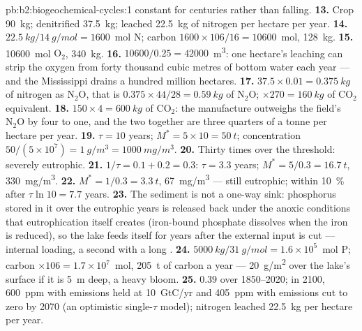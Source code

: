 \begin{solution}{pb:b2:biogeochemical-cycles:1}
constant for centuries rather than falling.
\textbf{13.} Crop \qty{90}{kg}; denitrified \qty{37.5}{kg}; leached
\qty{22.5}{kg} of nitrogen per hectare per year.
\textbf{14.} $\qty{22.5}{kg}/\qty{14}{g/mol} = 1600$~mol N; carbon
$1600\times 106/16 = \num{10600}$~mol, \qty{128}{kg}.
\textbf{15.} \num{10600}~mol $\mathrm{O_2}$, \qty{340}{kg}.
\textbf{16.} $\num{10600}/0.25 = \num{42000}$~\unit{m^3}: one
hectare's leaching can strip the oxygen from forty thousand cubic
metres of bottom water each year --- and the Mississippi drains
a hundred million hectares.
\textbf{17.} $37.5\times 0.01 = \qty{0.375}{kg}$ of nitrogen as
$\mathrm{N_2O}$, that is $0.375\times 44/28 = \qty{0.59}{kg}$ of $\mathrm{N_2O}$;
$\times 270 = \qty{160}{kg}$ of $\mathrm{CO_2}$ equivalent.
\textbf{18.} $150\times 4 = \qty{600}{kg}$ of $\mathrm{CO_2}$: the
manufacture outweighs the field's $\mathrm{N_2O}$ by four to one, and the
two together are three quarters of a tonne per hectare per year.
\textbf{19.} $\tau = 10$ years; $M^{*} = 5\times 10 = \qty{50}{t}$;
concentration $50/(5\times 10^{7}) = \qty{1}{g/m^3} =
\qty{1000}{mg/m^3}$.
\textbf{20.} Thirty times over the threshold: severely eutrophic.
\textbf{21.} $1/\tau = 0.1 + 0.2 = 0.3$: $\tau = 3.3$ years; $M^{*} =
5/0.3 = \qty{16.7}{t}$, \qty{330}{mg/m^3}.
\textbf{22.} $M^{*} = 1/0.3 = \qty{3.3}{t}$, \qty{67}{mg/m^3} --- still
eutrophic; within \qty{10}{\%} after $\tau\ln 10 = 7.7$ years.
\textbf{23.} The sediment is not a one-way sink: phosphorus stored
in it over the eutrophic years is released back under the anoxic
conditions that eutrophication itself creates (iron-bound
phosphate dissolves when the iron is reduced), so the lake feeds
itself for years after the external input is cut --- internal
loading, a second  with a long .
\textbf{24.} $\qty{5000}{kg}/\qty{31}{g/mol} = 1.6\times 10^{5}$~mol P;
carbon $\times 106 = 1.7\times 10^{7}$~mol, \qty{205}{t} of carbon a
year --- \qty{20}{g/m^2} over the lake's surface if it is
\qty{5}{m} deep, a heavy bloom.
\textbf{25.}  $0.39$ over 1850--2020; in 2100,
\qty{600}{ppm} with emissions held at \qty{10}{GtC/yr} and
\qty{405}{ppm} with emissions cut to zero by 2070 (an optimistic
single-$\tau$ model); nitrogen leached \qty{22.5}{kg} per hectare
per year.
\end{solution}

